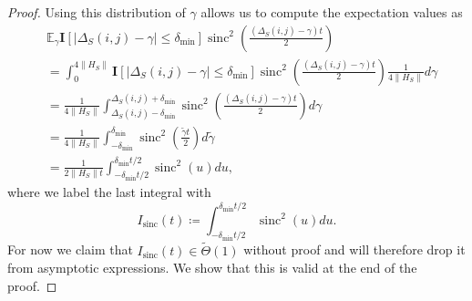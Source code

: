 \documentclass{article}
\newcommand{\norm}[1]{\| #1 \|}
\newcommand{\EE}{\mathbb{E}}
\DeclareMathOperator{\sinc}{sinc}
\begin{document}
\begin{proof}
Using this distribution of $\gamma$ allows us to compute the expectation values as
\begin{align}
    &\EE_\gamma \mathbf{I}[|\Delta_S(i,j) - \gamma| \le \delta_{\min}] \sinc^2 \left( \frac{(\Delta_S(i, j) - \gamma) t}{2} \right) \nonumber \\
    &= \int_0^{4 \norm{H_S}} \mathbf{I}[|\Delta_S(i,j) - \gamma| \le \delta_{\min}] \sinc^2 \left( \frac{(\Delta_S(i, j) - \gamma) t}{2} \right) \frac{1}{4 \norm{H_S}} d\gamma \\
    &= \frac{1}{4 \norm{H_S}} \int_{\Delta_S(i,j) - \delta_{\min}}^{\Delta_S(i,j) + \delta_{\min}} \sinc^2 \left( \frac{(\Delta_S(i, j) - \gamma) t}{2} \right) d\gamma \\
    &= \frac{1}{4 \norm{H_S}} \int_{-\delta_{\min}}^{\delta_{\min}} \sinc^2 \left( \frac{\widetilde{\gamma} t}{2} \right) d\widetilde{\gamma} \\
    &= \frac{1}{2 \norm{H_S} t} \int_{-\delta_{\min} t/2}^{\delta_{\min} t/2} \sinc^2 (u) du ,\label{eq:ground_state_expect_gamma_1}
\end{align}
where we label the last integral with
\begin{equation}
    I_{\sinc}(t) \coloneqq  \int_{-\delta_{\min} t/2}^{\delta_{\min} t/2} \sinc^2 (u) du  . \label{eq:ground_state_prep_sinc_integral}
\end{equation}
For now we claim that $I_{\sinc}(t) \in \widetilde{\Theta}(1)$ without proof and will therefore drop it from asymptotic expressions. We show that this is valid at the end of the proof.


\end{proof}
\end{document}
